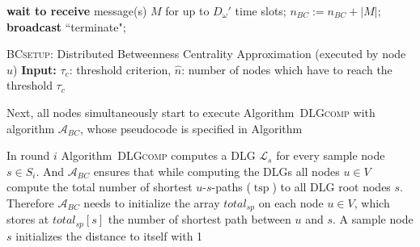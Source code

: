 \documentclass[11pt]{article}
\newcommand{\tsp}{\mathop{tsp}}
\newcommand{\calL}{\mathcal{L}}
\newif\iffull
\newif\ifshort
\begin{document}
\begin{algorithm}[htp]
\begin{algorithmic}[1]
        \ENDIF
                \STATE \textbf{wait to receive} message(s) $M$ for up to $D_\omega'$ time slots;
                \STATE $n_{BC}:=n_{BC}+|M|$;
                 \label{line:BCnhatcheck}
                        \STATE \textbf{broadcast} ``terminate";
                \ENDIF
        \ENDIF
\ENDFOR
\end{algorithmic}
\caption{\textsc{BCsetup}: Distributed Betweenness Centrality Approximation (executed by node $u$) 
\newline \textbf{Input:}  $\tau_c$: threshold criterion, $\hat{n}$: number of nodes which have to reach the threshold $\tau_c$}
\label{alg:BC_setup_controlling}
\vspace*{0.5cm}
\end{algorithm}
\fi


Next, all nodes simultaneously start to execute Algorithm\iffull~\ref{alg:DLGcomp}\fi~\textsc{DLGcomp} with algorithm $\mathcal{A}_{BC}$, whose pseudocode is specified in Algorithm
\ifshort
 \ref{FULL:alg:BC_f} in Appendix \ref{sec:algBC}.
\fi
\iffull
 \ref{alg:BC_f}.
\fi
In round $i$ Algorithm\iffull~\ref{alg:DLGcomp}\fi~\textsc{DLGcomp} computes a DLG $\calL_s$ for every sample node $s\in S_i$. And $\mathcal{A}_{BC}$ ensures that while computing the DLGs all nodes $u\in V$ compute the total number of shortest $u$-$s$-paths ($\tsp$) to all DLG root nodes $s$. Therefore $\mathcal{A}_{BC}$ needs to initialize the array $total_{sp}$ on each node $u\in V$, which stores at $total_{sp}[s]$ the number of shortest path between $u$ and $s$\iffull (Lines \ref{line:fbcinitstart} to \ref{line:fbcinitend})\fi. A sample node $s$ initializes the distance to itself with 1 
\end{document}
